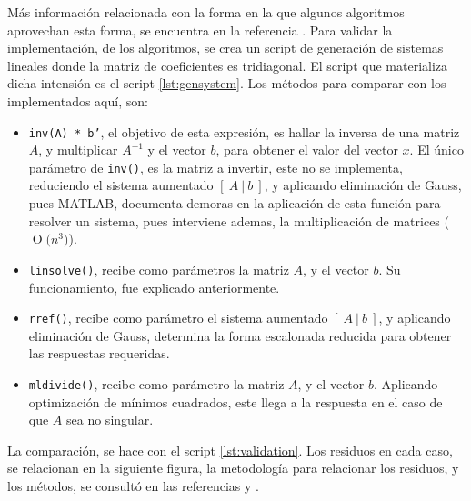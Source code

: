 \documentclass[11pt, spanish]{article}
\newcommand{\BigO}[1]{\ensuremath{\operatorname{O}\bigl(#1\bigr)}}
\begin{document}
\begin{enumerate}
Más información relacionada con la forma en la que algunos algoritmos aprovechan esta forma, se encuentra en la referencia \cite{suli2003introduction}. Para validar la implementación, de los algoritmos, se crea un script de generación de sistemas lineales donde la matriz de coeficientes es tridiagonal. El script que materializa dicha intensión es el script \ref{lst:gensystem}. Los métodos para comparar con los implementados aquí, son:

\begin{itemize}
\item \texttt{inv(A) * b'}, el objetivo de esta expresión, es hallar la inversa de una matriz $A$, y multiplicar $A^{-1}$ y el vector $b$, para obtener el valor del vector $x$. El único parámetro de \texttt{inv()}, es la matriz a invertir, este no se implementa, reduciendo el sistema aumentado $[\ A\ |\ b\ ]$, y aplicando eliminación de Gauss, pues \textsc{MATLAB}, documenta demoras en la aplicación de esta función para resolver un sistema, pues interviene ademas, la multiplicación de matrices (\BigO{n^3 }).

\item \texttt{linsolve()}, recibe como parámetros la matriz $A$, y el vector $b$. Su funcionamiento, fue explicado anteriormente.

\item \texttt{rref()}, recibe como parámetro el sistema aumentado $[\ A\ |\ b\ ]$, y aplicando eliminación de Gauss, determina la forma escalonada reducida para obtener las respuestas requeridas.

\item \texttt{mldivide()}, recibe como parámetro la matriz $A$, y el vector $b$. Aplicando optimización de mínimos cuadrados, este llega a la respuesta en el caso de que $A$ sea no singular.
\end{itemize}

\newpage

La comparación, se hace con el script \ref{lst:validation}. Los residuos en cada caso, se relacionan en la siguiente figura, la metodología para relacionar los residuos, y los métodos, se consultó en las referencias \cite{isaacson1994analysis} y \cite{zalizniak2008essentials}.



\end{enumerate}
\end{document}
